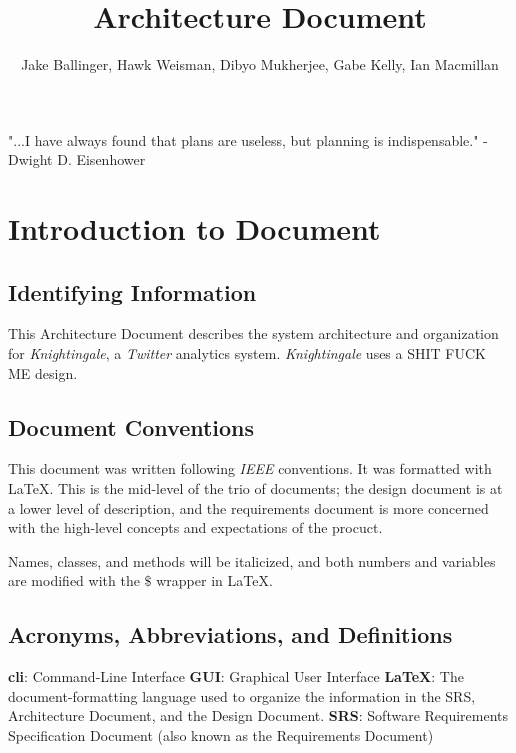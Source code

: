 \documentclass[a4paper, 12pt]{article}
\title{Architecture Document}
\author{Jake Ballinger, Hawk Weisman, Dibyo Mukherjee, Gabe Kelly, Ian Macmillan}
\begin{document}
\maketitle

\begin{center}
\centering  "...I have always found that plans are useless, but planning is indispensable." \newline
\centering - Dwight D. Eisenhower
\end{center}

\section{Introduction to Document} \label{sec:intro}
\subsection{Identifying Information} \label{sec:identify}
\begin{adjustwidth}{2em}{0pt}
This Architecture Document describes the system architecture and organization for \textit{Knightingale}, a \textit{Twitter} analytics system. \textit{Knightingale} uses a SHIT FUCK ME design.
\end{adjustwidth}

\subsection{Document Conventions} \label{sec:conventions}
\begin{adjustwidth}{2em}{0pt}
This document was written following \textit{IEEE} conventions. It was formatted with \LaTeX. This is the mid-level of the trio of documents; the design document is at a lower level of description, and the requirements document is more concerned with the high-level concepts and expectations of the procuct. \newline

\noindent Names, classes, and methods will be italicized, and both numbers and variables are modified with the $\$$ wrapper in \LaTeX.
\end{adjustwidth}

\subsection{Acronyms, Abbreviations, and Definitions} \label{sec:abbr}
\begin{adjustwidth}{2em}{0pt}
\textbf{cli}: Command-Line Interface \newline
\noindent \textbf{GUI}: Graphical User Interface \newline
\noindent \textbf{\LaTeX}: The document-formatting language used to organize the information in the SRS, Architecture Document, and the Design Document. \newline
\noindent \textbf{SRS}: Software Requirements Specification Document (also known as the Requirements Document)
\end{adjustwidth}
\end{document}
